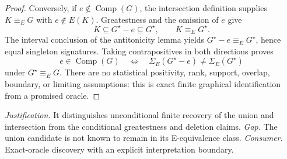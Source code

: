 \documentclass{article}
\begin{document}
\begin{proof}
Conversely, if \(e\notin\operatorname{Comp}(G)\), the intersection definition supplies \(K\equiv_EG\) with \(e\notin E(K)\).  Greatestness and the omission of \(e\) give
\[
 K\subseteq G^\star-e\subseteq G^\star,
 \qquad K\equiv_EG^\star.
\]
The interval conclusion of the antitonicity lemma yields \(G^\star-e\equiv_EG^\star\), hence equal singleton signatures.  Taking contrapositives in both directions proves
\[
 e\in\operatorname{Comp}(G)
 \quad\Longleftrightarrow\quad
 \Sigma_E(G^\star-e)\ne\Sigma_E(G^\star)
\]
under \(G^\star\equiv_EG\).  There are no statistical positivity, rank, support, overlap, boundary, or limiting assumptions: this is exact finite graphical identification from a promised oracle.
\end{proof}
\par\smallskip\noindent \textit{Justification.} It distinguishes unconditional finite recovery of the union and intersection from the conditional greatestness and deletion claims. \textit{Gap.} The union candidate is not known to remain in its E-equivalence class. \textit{Consumer.} Exact-oracle discovery with an explicit interpretation boundary.
\end{document}
